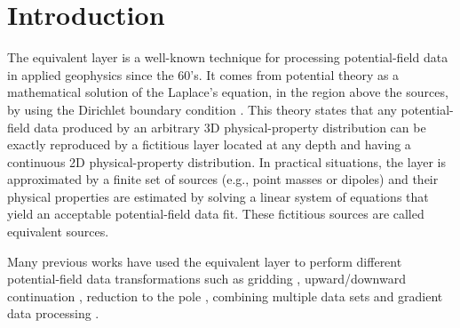 \section{Introduction}

The equivalent layer is a well-known technique for processing potential-field data in applied geophysics 
since the 60's. 
It comes from potential theory as a mathematical solution of the Laplace's equation, in the region above the
sources, by using the Dirichlet boundary condition \citep{kellogg1929}.
This theory states that any potential-field data produced by an arbitrary 3D physical-property distribution can 
be exactly reproduced by a fictitious layer located at any depth and having a continuous 2D physical-property  
distribution. In practical situations, the layer is approximated by a finite set of sources (e.g., point masses 
or dipoles) and their physical properties are estimated by solving a linear system of equations that yield an 
acceptable potential-field data fit. These fictitious sources are called equivalent sources.

Many previous works have used the equivalent layer to perform different potential-field data 
transformations such as gridding \citep[e.g.,][]{dampney1969, cordell1992, mendonca-silva1994},
upward/downward continuation \citep[e.g.,][]{emilia1973, hansen-miyazaki1984, 
li-oldenburg2010}, reduction to the pole \citep[e.g.,]{silva1986, leao-silva1989, guspi-novara2009, 
oliveirajr-etal2013}, combining multiple data sets \citep[e.g.,][]{boggs-dransfield2004} and 
gradient data processing \citep[e.g.,][]{barnes-lumley2011}.

